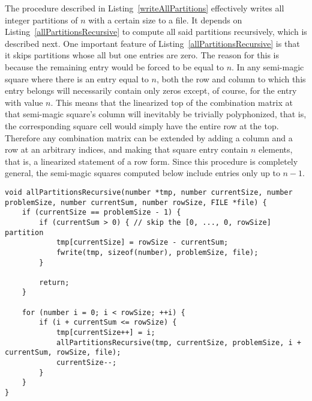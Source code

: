 The procedure described in Listing~\ref{writeAllPartitions} effectively writes all integer partitions of $n$ with a certain size to a file. It depends on Listing~\ref{allPartitionsRecursive} to compute all said partitions recursively, which is described next. One important feature of Listing~\ref{allPartitionsRecursive} is that it skips partitions whose all but one entries are zero. The reason for this is because the remaining entry would be forced to be equal to $n$. In any semi-magic square where there is an entry equal to $n$, both the row and column to which this entry belongs will necessarily contain only zeros except, of course, for the entry with value $n$. This means that the linearized top of the combination matrix at that semi-magic square's column will inevitably be trivially polyphonized, that is, the corresponding square cell would simply have the entire row at the top. Therefore any combination matrix can be extended by adding a column and a row at an arbitrary indices, and making that square entry contain $n$ elements, that is, a linearized statement of a row form. Since this procedure is completely general, the semi-magic squares computed below include entries only up to $n - 1$.

\begin{lstlisting}[caption={Recursively computing all partitions of a number $n$ and permutations thereof with a certain size.},label={allPartitionsRecursive}]
void allPartitionsRecursive(number *tmp, number currentSize, number problemSize, number currentSum, number rowSize, FILE *file) {
    if (currentSize == problemSize - 1) {
        if (currentSum > 0) { // skip the [0, ..., 0, rowSize] partition
            tmp[currentSize] = rowSize - currentSum;
            fwrite(tmp, sizeof(number), problemSize, file);
        }

        return;
    }

    for (number i = 0; i < rowSize; ++i) {
        if (i + currentSum <= rowSize) {
            tmp[currentSize++] = i;
            allPartitionsRecursive(tmp, currentSize, problemSize, i + currentSum, rowSize, file);
            currentSize--;
        }
    }
}
\end{lstlisting}

